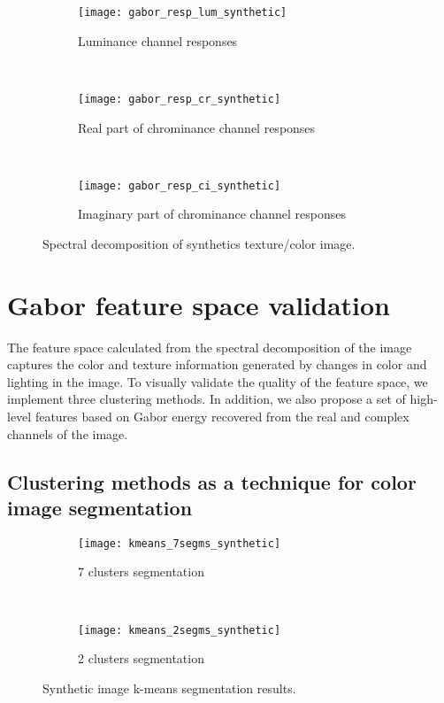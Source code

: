 \begin{figure}[!ht]
    \centering
    \begin{subfigure}[b]{\textwidth}
        \texttt{[image: gabor\_resp\_lum\_synthetic]}
        \caption{Luminance channel responses}
    \end{subfigure} \\    
    \begin{subfigure}[b]{\textwidth}
    	\texttt{[image: gabor\_resp\_cr\_synthetic]}
        \caption{Real part of chrominance channel responses}
    \end{subfigure} \\    	
    \begin{subfigure}[b]{\textwidth}
        \texttt{[image: gabor\_resp\_ci\_synthetic]}
        \caption{Imaginary part of chrominance channel responses}
    \end{subfigure} 
    	    
    \caption{Spectral decomposition of synthetics texture/color image.}\label{fig:synthetic_img_gresponses}    
\end{figure}



\section{Gabor feature space validation}
The feature space calculated from the spectral decomposition of the image captures the color and texture information generated by changes in color and lighting in the image. To visually validate the quality of the feature space, we implement three clustering methods. In addition, we also propose a set of high-level features based on Gabor energy recovered from the real and complex channels of the image.

\subsection{Clustering methods as a technique for color image segmentation}

\begin{figure}[!ht]
    \centering
    \begin{subfigure}[b]{\textwidth}
        \texttt{[image: kmeans\_7segms\_synthetic]}
        \caption{7 clusters segmentation}
    \end{subfigure} \\    
    \begin{subfigure}[b]{\textwidth}
    	\texttt{[image: kmeans\_2segms\_synthetic]}
        \caption{2 clusters segmentation}
    \end{subfigure} 
        	    
    \caption{Synthetic image k-means segmentation results.}\label{fig:kmeans_segms_synthetic_img}    
\end{figure}


